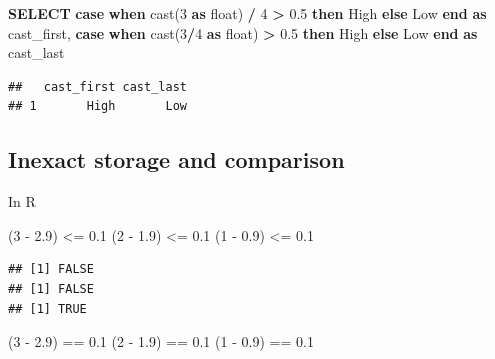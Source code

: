 \documentclass[
]{krantz}
\makeatletter
\newenvironment{Shaded}{\begin{snugshade}}{\end{snugshade}}
\newcommand{\ControlFlowTok}[1]{\textcolor[rgb]{0.27,0.27,0.27}{\textbf{#1}}}
\newcommand{\DataTypeTok}[1]{\textcolor[rgb]{0.27,0.27,0.27}{#1}}
\newcommand{\DecValTok}[1]{\textcolor[rgb]{0.06,0.06,0.06}{#1}}
\newcommand{\FloatTok}[1]{\textcolor[rgb]{0.06,0.06,0.06}{#1}}
\newcommand{\FunctionTok}[1]{\textcolor[rgb]{0,0,0}{#1}}
\newcommand{\KeywordTok}[1]{\textcolor[rgb]{0.27,0.27,0.27}{\textbf{#1}}}
\newcommand{\NormalTok}[1]{#1}
\newcommand{\OperatorTok}[1]{\textcolor[rgb]{0.43,0.43,0.43}{\textbf{#1}}}
\newcommand{\SpecialCharTok}[1]{\textcolor[rgb]{0,0,0}{#1}}
\newcommand{\StringTok}[1]{\textcolor[rgb]{0.5,0.5,0.5}{#1}}
\newenvironment{kframe}{%
\medskip{}
\setlength{\fboxsep}{.8em}
 \def\at@end@of@kframe{}%
 \ifinner\ifhmode%
  \def\at@end@of@kframe{\end{minipage}}%
  \begin{minipage}{\columnwidth}%
 \fi\fi%
 \def\FrameCommand##1{\hskip\@totalleftmargin \hskip-\fboxsep
 \colorbox{shadecolor}{##1}\hskip-\fboxsep
     \hskip-\linewidth \hskip-\@totalleftmargin \hskip\columnwidth}%
 \MakeFramed {\advance\hsize-\width
   \@totalleftmargin\z@ \linewidth\hsize
   \@setminipage}}%
 {\par\unskip\endMakeFramed%
 \at@end@of@kframe}
\renewenvironment{Shaded}{\begin{kframe}}{\end{kframe}}
\makeatother
\begin{document}
\begin{Shaded}
\begin{Highlighting}[]
\KeywordTok{SELECT}
  \ControlFlowTok{case} 
    \ControlFlowTok{when} \FunctionTok{cast}\NormalTok{(}\DecValTok{3} \KeywordTok{as} \DataTypeTok{float}\NormalTok{) }\OperatorTok{/} \DecValTok{4} \OperatorTok{\textgreater{}} \FloatTok{0.5} \ControlFlowTok{then} \StringTok{\textquotesingle{}High\textquotesingle{}}
    \ControlFlowTok{else} \StringTok{\textquotesingle{}Low\textquotesingle{}}
  \ControlFlowTok{end} \KeywordTok{as}\NormalTok{ cast\_first,}
  \ControlFlowTok{case}
    \ControlFlowTok{when} \FunctionTok{cast}\NormalTok{(}\DecValTok{3}\OperatorTok{/}\DecValTok{4} \KeywordTok{as} \DataTypeTok{float}\NormalTok{) }\OperatorTok{\textgreater{}} \FloatTok{0.5} \ControlFlowTok{then} \StringTok{\textquotesingle{}High\textquotesingle{}}
    \ControlFlowTok{else} \StringTok{\textquotesingle{}Low\textquotesingle{}}
  \ControlFlowTok{end} \KeywordTok{as}\NormalTok{ cast\_last}
\end{Highlighting}
\end{Shaded}

\begin{verbatim}
##   cast_first cast_last
## 1       High       Low
\end{verbatim}

\hypertarget{inexact-storage-and-comparison}{%
\subsection{Inexact storage and comparison}\label{inexact-storage-and-comparison}}

In R

\begin{Shaded}
\begin{Highlighting}[]
\NormalTok{(}\DecValTok{3} \SpecialCharTok{{-}} \FloatTok{2.9}\NormalTok{) }\SpecialCharTok{\textless{}=} \FloatTok{0.1}
\NormalTok{(}\DecValTok{2} \SpecialCharTok{{-}} \FloatTok{1.9}\NormalTok{) }\SpecialCharTok{\textless{}=} \FloatTok{0.1}
\NormalTok{(}\DecValTok{1} \SpecialCharTok{{-}} \FloatTok{0.9}\NormalTok{) }\SpecialCharTok{\textless{}=} \FloatTok{0.1}
\end{Highlighting}
\end{Shaded}

\begin{verbatim}
## [1] FALSE
## [1] FALSE
## [1] TRUE
\end{verbatim}

\begin{Shaded}
\begin{Highlighting}[]
\NormalTok{(}\DecValTok{3} \SpecialCharTok{{-}} \FloatTok{2.9}\NormalTok{) }\SpecialCharTok{==} \FloatTok{0.1}
\NormalTok{(}\DecValTok{2} \SpecialCharTok{{-}} \FloatTok{1.9}\NormalTok{) }\SpecialCharTok{==} \FloatTok{0.1}
\NormalTok{(}\DecValTok{1} \SpecialCharTok{{-}} \FloatTok{0.9}\NormalTok{) }\SpecialCharTok{==} \FloatTok{0.1}
\end{Highlighting}
\end{Shaded}
\end{document}

